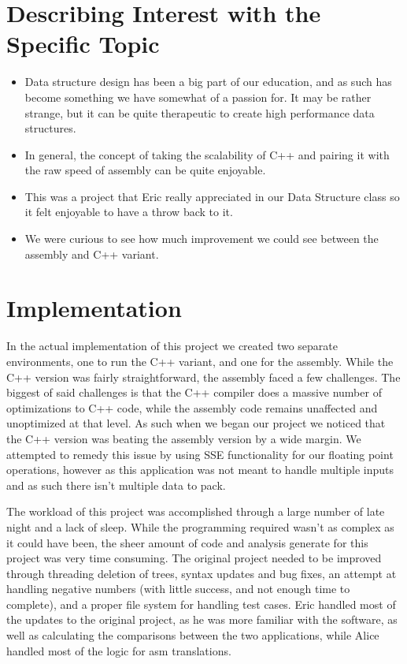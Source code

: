 \documentclass[a4paper,10pt]{article}
\begin{document}
\section*{Describing Interest with the Specific Topic}
\begin{itemize}
  \item Data structure design has been a big part of our education, and as such has become something we have somewhat of a passion for. It may be rather strange, but it can be quite therapeutic to create high performance data structures.
  \item In general, the concept of taking the scalability of C++ and pairing it with the raw speed of assembly can be quite enjoyable.
  \item This was a project that Eric really appreciated in our Data Structure class so it felt enjoyable to have a throw back to it.
  \item We were curious to see how much improvement we could see between the assembly and C++ variant.
\end{itemize} 

\section*{Implementation}
\smallskip 
In the actual implementation of this project we created two separate environments, one to run the C++ variant, and one for the assembly. While the C++ version was fairly straightforward, the assembly faced a few challenges. The biggest of said challenges is that the C++ compiler does a massive number of optimizations to C++ code, while the assembly code remains unaffected and unoptimized at that level. As such when we began our project we noticed that the C++ version was beating the assembly version by a wide margin. We attempted to remedy this issue by using SSE functionality for our floating point operations, however as this application was not meant to handle multiple inputs and as such there isn't multiple data to pack.

\smallskip
The workload of this project was accomplished through a large number of late night and a lack of sleep. While the programming required wasn't as complex as it could have been, the sheer amount of code and analysis generate for this project was very time consuming. The original project needed to be improved through threading deletion of trees, syntax updates and bug fixes, an attempt at handling negative numbers (with little success, and not enough time to complete), and a proper file system for handling test cases. Eric handled most of the updates to the original project, as he was more familiar with the software, as well as calculating the comparisons between the two applications, while Alice handled most of the logic for asm translations. 
\end{document}
